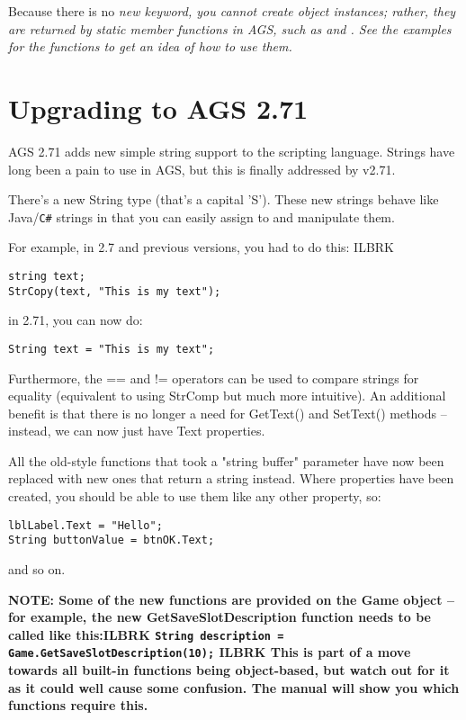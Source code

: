 Because there is no \it{new} keyword, you cannot create object instances; rather, they
are returned by static member functions in AGS, such as 
and . See the examples for the
functions to get an idea of how to use them.


\section{Upgrading to AGS 2.71}\label{UpgradingTo271}%

AGS 2.71 adds new simple string support to the scripting language. Strings have long
been a pain to use in AGS, but this is finally addressed by v2.71.

There's a new String type (that's a capital 'S'). These new strings behave like Java/\verb$C#$
strings in that you can easily assign to and manipulate them.

For example, in 2.7 and previous versions, you had to do this: ILBRK
\begin{verbatim}
string text;
StrCopy(text, "This is my text");
\end{verbatim}
in 2.71, you can now do:
\begin{verbatim}
String text = "This is my text";
\end{verbatim}
Furthermore, the == and != operators can be used to compare strings for equality (equivalent
to using StrComp but much more intuitive). An additional benefit is that there is no longer
a need for GetText() and SetText() methods -- instead, we can now just have Text properties.

All the old-style functions that took a "string buffer" parameter have now been replaced with
new ones that return a string instead. Where properties have been created, you should be able
to use them like any other property, so:
\begin{verbatim}
lblLabel.Text = "Hello";
String buttonValue = btnOK.Text;
\end{verbatim}
and so on.

\bf{NOTE:} Some of the new functions are provided on the Game object -- for example, the new
GetSaveSlotDescription function needs to be called like this:ILBRK
\verb$String description = Game.GetSaveSlotDescription(10);$ ILBRK
This is part of a move towards all built-in functions being object-based, but watch out for it
as it could well cause some confusion. The manual will show you which functions require this.

